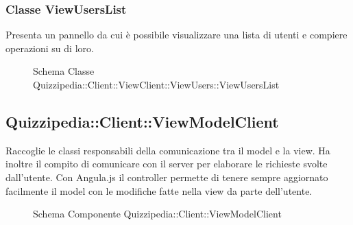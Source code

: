 \subsubsection{Classe ViewUsersList}
Presenta un pannello da cui è possibile visualizzare una lista di utenti e compiere operazioni su di loro.
\begin{figure}[H]
\centering
\noindent{}
\caption[Schema Classe ViewUsersList]{Schema Classe Quizzipedia::Client::ViewClient::ViewUsers::ViewUsersList}
\end{figure}
\subsection{Quizzipedia::Client::ViewModelClient}
Raccoglie le classi responsabili della comunicazione tra il model e la view. Ha inoltre il compito di comunicare con il server per elaborare le richieste svolte dall'utente.
Con Angula.js il controller permette di tenere sempre aggiornato facilmente il model con le modifiche fatte nella view da parte dell'utente.
\begin{figure}[H]
\centering
\noindent{}
\caption[Schema Componente Quizzipedia::Client::ViewModelClient]{Schema Componente Quizzipedia::Client::ViewModelClient}
\end{figure}
